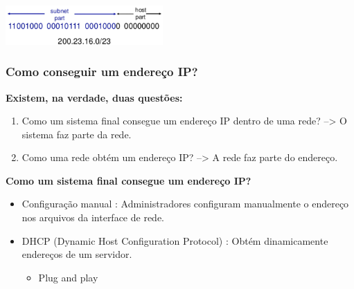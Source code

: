             \begin{center}
                \includegraphics[width=0.45\textwidth]{img/cap-04/cidr.png}
            \end{center}

        \subsubsection*{Como conseguir um endereço IP?}

            \textbf{Existem, na verdade, duas questões:}
            \begin{enumerate}
                \item Como um sistema final consegue um endereço IP dentro de uma rede? --> O sistema faz parte da rede.
                \item Como uma rede obtém um endereço IP? --> A rede faz parte do endereço.
            \end{enumerate}

            \textbf{Como um sistema final consegue um endereço IP?}
            \begin{itemize}[left=0.5cm, align=left, nosep]
                \item Configuração manual : Administradores configuram manualmente o endereço nos arquivos da interface de rede.
                \item DHCP (Dynamic Host Configuration Protocol) : Obtém dinamicamente endereços de um servidor.
                    \begin{itemize}[left=0.5cm, nosep, label=$\hookrightarrow$]
                        \item Plug and play  
                    \end{itemize} 
            \end{itemize}

